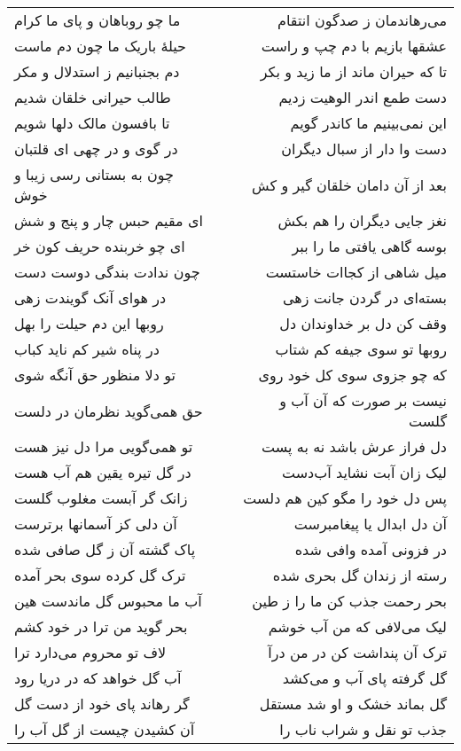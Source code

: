 \begin{center}
\begin{longtable}{l p{0.5cm} r}
ما چو روباهان و پای ما کرام
&&
می‌رهاندمان ز صدگون انتقام
\\
حیلهٔ باریک ما چون دم ماست
&&
عشقها بازیم با دم چپ و راست
\\
دم بجنبانیم ز استدلال و مکر
&&
تا که حیران ماند از ما زید و بکر
\\
طالب حیرانی خلقان شدیم
&&
دست طمع اندر الوهیت زدیم
\\
تا بافسون مالک دلها شویم
&&
این نمی‌بینیم ما کاندر گویم
\\
در گوی و در چهی ای قلتبان
&&
دست وا دار از سبال دیگران
\\
چون به بستانی رسی زیبا و خوش
&&
بعد از آن دامان خلقان گیر و کش
\\
ای مقیم حبس چار و پنج و شش
&&
نغز جایی دیگران را هم بکش
\\
ای چو خربنده حریف کون خر
&&
بوسه گاهی یافتی ما را ببر
\\
چون ندادت بندگی دوست دست
&&
میل شاهی از کجاات خاستست
\\
در هوای آنک گویندت زهی
&&
بسته‌ای در گردن جانت زهی
\\
روبها این دم حیلت را بهل
&&
وقف کن دل بر خداوندان دل
\\
در پناه شیر کم ناید کباب
&&
روبها تو سوی جیفه کم شتاب
\\
تو دلا منظور حق آنگه شوی
&&
که چو جزوی سوی کل خود روی
\\
حق همی‌گوید نظرمان در دلست
&&
نیست بر صورت که آن آب و گلست
\\
تو همی‌گویی مرا دل نیز هست
&&
دل فراز عرش باشد نه به پست
\\
در گل تیره یقین هم آب هست
&&
لیک زان آبت نشاید آب‌دست
\\
زانک گر آبست مغلوب گلست
&&
پس دل خود را مگو کین هم دلست
\\
آن دلی کز آسمانها برترست
&&
آن دل ابدال یا پیغامبرست
\\
پاک گشته آن ز گل صافی شده
&&
در فزونی آمده وافی شده
\\
ترک گل کرده سوی بحر آمده
&&
رسته از زندان گل بحری شده
\\
آب ما محبوس گل ماندست هین
&&
بحر رحمت جذب کن ما را ز طین
\\
بحر گوید من ترا در خود کشم
&&
لیک می‌لافی که من آب خوشم
\\
لاف تو محروم می‌دارد ترا
&&
ترک آن پنداشت کن در من درآ
\\
آب گل خواهد که در دریا رود
&&
گل گرفته پای آب و می‌کشد
\\
گر رهاند پای خود از دست گل
&&
گل بماند خشک و او شد مستقل
\\
آن کشیدن چیست از گل آب را
&&
جذب تو نقل و شراب ناب را

\end{longtable}
\end{center}
